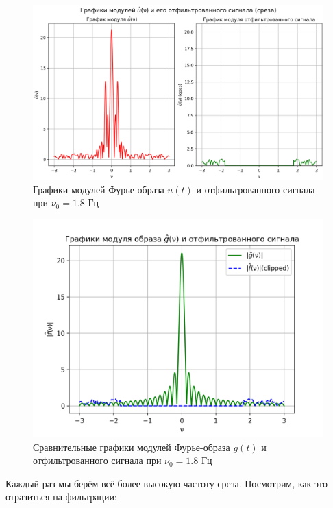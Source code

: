 \begin{figure}[ht!]
    \centering
    \includegraphics[scale=0.55]{media/1 task/low_freq/Fourier_Image_4_2_2-1,7987987987987988.png}
    \caption{Графики модулей Фурье-образа $u(t)$ и отфильтрованного сигнала при $\nu_0=1.8$ Гц}
    \label{fig:four_4_2_2_1.8}
\end{figure}

\clearpage

\begin{figure}[ht!]
    \centering
    \includegraphics[scale=0.55]{media/1 task/low_freq/Fourier_Image_Comparison_4_2_2-1,7987987987987988.png}
    \caption{Сравнительные графики модулей Фурье-образа $g(t)$ и отфильтрованного сигнала при $\nu_0=1.8$ Гц}
    \label{fig:fourc_4_2_2_1.8}
\end{figure}


Каждый раз мы берём всё более высокую частоту среза. Посмотрим, как это отразиться на фильтрации:

